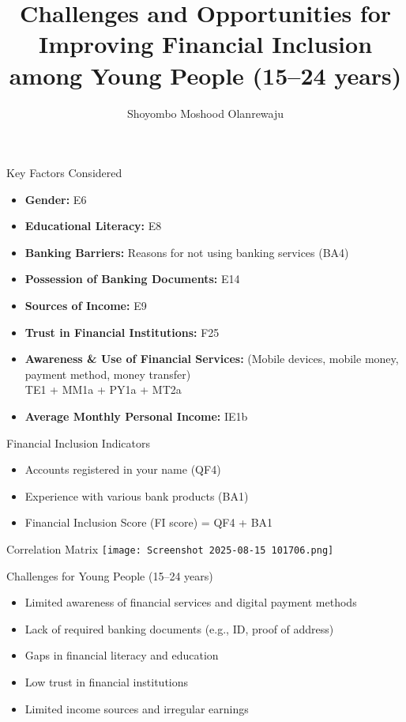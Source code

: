 \documentclass{beamer}
\title[Financial Inclusion]{Challenges and Opportunities for Improving Financial Inclusion among Young People (15--24 years)}
\author{Shoyombo Moshood Olanrewaju}
\date{}
\begin{document}
\frame{\titlepage}

\begin{frame}{Key Factors Considered}
\begin{itemize}
    \item \textbf{Gender:} E6
    \item \textbf{Educational Literacy:} E8
    \item \textbf{Banking Barriers:} Reasons for not using banking services (BA4)
    \item \textbf{Possession of Banking Documents:} E14
    \item \textbf{Sources of Income:} E9
    \item \textbf{Trust in Financial Institutions:} F25
    \item \textbf{Awareness \& Use of Financial Services:} (Mobile devices, mobile money, payment method, money transfer)\\ TE1 + MM1a + PY1a + MT2a
    \item \textbf{Average Monthly Personal Income:} IE1b
\end{itemize}
\end{frame}

\begin{frame}{Financial Inclusion Indicators}
\begin{itemize}
    \item Accounts registered in your name (QF4)
    \item Experience with various bank products (BA1)
    \item Financial Inclusion Score (FI score) = QF4 + BA1
\end{itemize}
\end{frame}


\begin{frame}{Correlation Matrix}
\texttt{[image: Screenshot 2025-08-15 101706.png]} 

\end{frame}



\begin{frame}{Challenges for Young People (15--24 years)}
\begin{itemize}
    \item Limited awareness of financial services and digital payment methods
    \item Lack of required banking documents (e.g., ID, proof of address)
    \item Gaps in financial literacy and education
    \item Low trust in financial institutions
    \item Limited income sources and irregular earnings
\end{itemize}
\end{frame}
\end{document}

